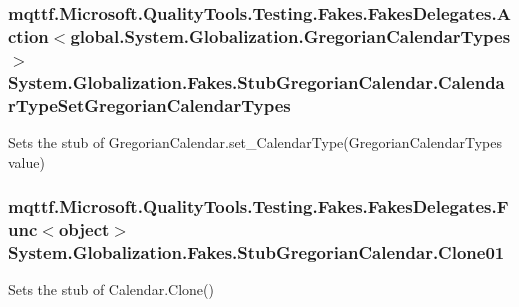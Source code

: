 \hypertarget{class_system_1_1_globalization_1_1_fakes_1_1_stub_gregorian_calendar_a6655ccf832a8c1e6127d7d0c946b9ca4}{
\subsubsection[{Calendar\-Type\-Set\-Gregorian\-Calendar\-Types}]{\setlength{\rightskip}{0pt plus 5cm}mqttf.\-Microsoft.\-Quality\-Tools.\-Testing.\-Fakes.\-Fakes\-Delegates.\-Action$<$global.\-System.\-Globalization.\-Gregorian\-Calendar\-Types$>$ System.\-Globalization.\-Fakes.\-Stub\-Gregorian\-Calendar.\-Calendar\-Type\-Set\-Gregorian\-Calendar\-Types}}\label{class_system_1_1_globalization_1_1_fakes_1_1_stub_gregorian_calendar_a6655ccf832a8c1e6127d7d0c946b9ca4}


Sets the stub of Gregorian\-Calendar.\-set\-\_\-\-Calendar\-Type(\-Gregorian\-Calendar\-Types value)

\hypertarget{class_system_1_1_globalization_1_1_fakes_1_1_stub_gregorian_calendar_a1459447edbc7826b2d9b5619197c4e45}{
\subsubsection[{Clone01}]{\setlength{\rightskip}{0pt plus 5cm}mqttf.\-Microsoft.\-Quality\-Tools.\-Testing.\-Fakes.\-Fakes\-Delegates.\-Func$<$object$>$ System.\-Globalization.\-Fakes.\-Stub\-Gregorian\-Calendar.\-Clone01}}\label{class_system_1_1_globalization_1_1_fakes_1_1_stub_gregorian_calendar_a1459447edbc7826b2d9b5619197c4e45}


Sets the stub of Calendar.\-Clone()


